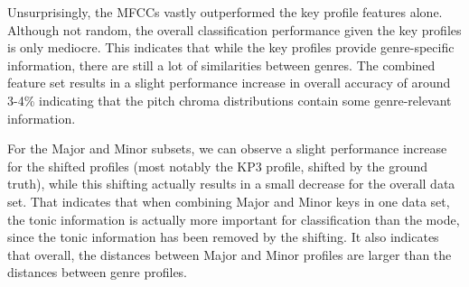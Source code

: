 \documentclass{article}
\begin{document}
\begin{table}
\begin{center}
    \caption{Classification accuracy for different feature combinations.}
    \label{tab:accuracyPC}
  \end{center}
\end{table}

Unsurprisingly, the MFCCs vastly outperformed the key profile features alone. Although not random, the overall classification performance given the key profiles is only mediocre. This indicates that while the key profiles provide genre-specific information, there are still a lot of similarities between genres. The combined feature set results in a slight performance increase in overall accuracy of around 3-4\% indicating that the pitch chroma distributions contain some genre-relevant information. 

For the Major and Minor subsets, we can observe a slight performance increase for the shifted profiles (most notably the KP3 profile, shifted by the ground truth), while this shifting actually results in a small decrease for the overall data set. That indicates that when combining Major and Minor keys in one data set, the tonic information is actually more important for classification than the mode, since the tonic information has been removed by the shifting. It also indicates that overall, the distances between Major and Minor profiles are larger than the distances between genre profiles. 
\end{document}
